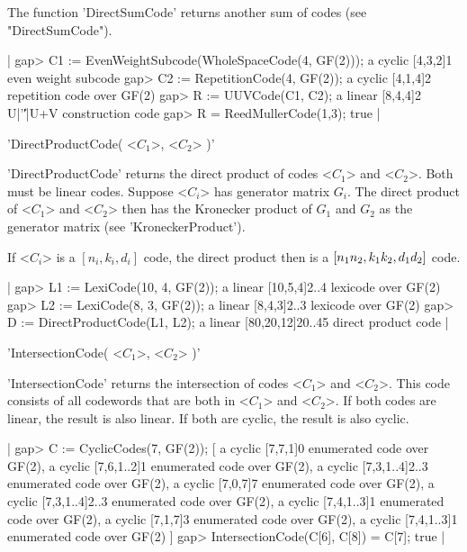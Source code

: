 The function    'DirectSumCode'   returns another   sum   of  codes  (see
"DirectSumCode").

|    gap> C1 := EvenWeightSubcode(WholeSpaceCode(4, GF(2)));
    a cyclic [4,3,2]1 even weight subcode
    gap> C2 := RepetitionCode(4, GF(2));
    a cyclic [4,1,4]2 repetition code over GF(2)
    gap> R := UUVCode(C1, C2);
    a linear [8,4,4]2 U|'\|'|U+V construction code
    gap> R = ReedMullerCode(1,3);
    true |


'DirectProductCode( <$C_1$>, <$C_2$> )'

'DirectProductCode' returns the   direct  product of codes   <$C_1$>  and
<$C_2$>. Both must be linear codes.  Suppose <$C_i$> has generator matrix
$G_i$. The direct product of  <$C_1$> and <$C_2$>  then has the Kronecker
product   of    $G_1$   and   $G_2$  as   the    generator    matrix (see
'KroneckerProduct').

If <$C_i$> is a $[n_i, k_i, d_i]$ code, the direct product then is a
$[n_1\*n_2,k_1\*k_2,d_1\*d_2]$ code.

|    gap> L1 := LexiCode(10, 4, GF(2));
    a linear [10,5,4]2..4 lexicode over GF(2)
    gap> L2 := LexiCode(8, 3, GF(2));
    a linear [8,4,3]2..3 lexicode over GF(2)
    gap> D := DirectProductCode(L1, L2);
    a linear [80,20,12]20..45 direct product code |


'IntersectionCode( <$C_1$>, <$C_2$> )'

'IntersectionCode' returns the intersection of codes <$C_1$> and <$C_2$>.
This code consists of all codewords that are both in <$C_1$> and <$C_2$>.
If both codes are linear, the result is also  linear. If both are cyclic,
the result is also cyclic.

|    gap> C := CyclicCodes(7, GF(2));
    [ a cyclic [7,7,1]0 enumerated code over GF(2),
      a cyclic [7,6,1..2]1 enumerated code over GF(2),
      a cyclic [7,3,1..4]2..3 enumerated code over GF(2),
      a cyclic [7,0,7]7 enumerated code over GF(2),
      a cyclic [7,3,1..4]2..3 enumerated code over GF(2),
      a cyclic [7,4,1..3]1 enumerated code over GF(2),
      a cyclic [7,1,7]3 enumerated code over GF(2),
      a cyclic [7,4,1..3]1 enumerated code over GF(2) ]
    gap> IntersectionCode(C[6], C[8]) = C[7];
    true |

